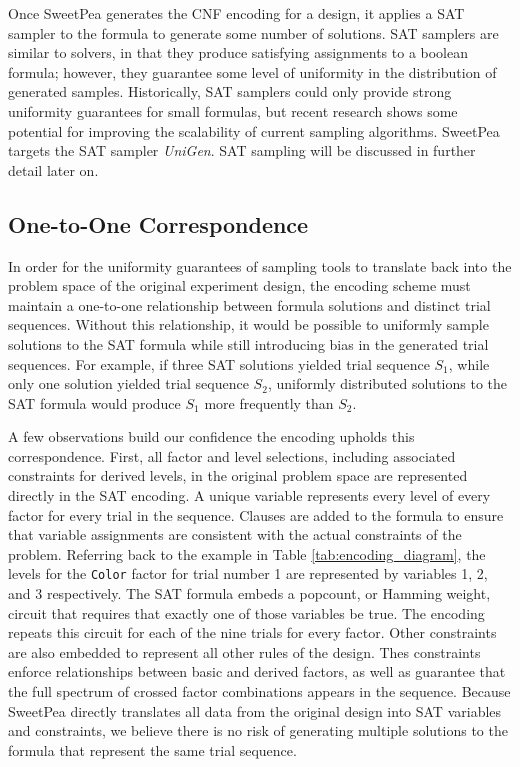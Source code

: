 Once SweetPea generates the CNF encoding for a design, it applies a SAT sampler to the formula to generate some number of solutions. SAT samplers are similar to solvers, in that they produce satisfying assignments to a boolean formula; however, they guarantee some level of uniformity in the distribution of generated samples. Historically, SAT samplers could only provide strong uniformity guarantees for small formulas, but recent research shows some potential for improving the scalability of current sampling algorithms. SweetPea targets the SAT sampler \textit{UniGen}. SAT sampling will be discussed in further detail later on.

\subsection{One-to-One Correspondence}

In order for the uniformity guarantees of sampling tools to translate back into the problem space of the original experiment design, the encoding scheme must maintain a one-to-one relationship between formula solutions and distinct trial sequences. Without this relationship, it would be possible to uniformly sample solutions to the SAT formula while still introducing bias in the generated trial sequences. For example, if three SAT solutions yielded trial sequence $S_1$, while only one solution yielded trial sequence $S_2$, uniformly distributed solutions to the SAT formula would produce $S_1$ more frequently than $S_2$.

A few observations build our confidence the encoding upholds this correspondence. First, all factor and level selections, including associated constraints for derived levels, in the original problem space are represented directly in the SAT encoding. A unique variable represents every level of every factor for every trial in the sequence. Clauses are added to the formula to ensure that variable assignments are consistent with the actual constraints of the problem. Referring back to the example in Table \ref{tab:encoding_diagram}, the levels for the \texttt{Color} factor for trial number 1 are represented by variables 1, 2, and 3 respectively. The SAT formula embeds a popcount, or Hamming weight, circuit that requires that exactly one of those variables be true. The encoding repeats this circuit for each of the nine trials for every factor. Other constraints are also embedded to represent all other rules of the design. Thes constraints enforce relationships between basic and derived factors, as well as guarantee that the full spectrum of crossed factor combinations appears in the sequence. Because SweetPea directly translates all data from the original design into SAT variables and constraints, we believe there is no risk of generating multiple solutions to the formula that represent the same trial sequence.

